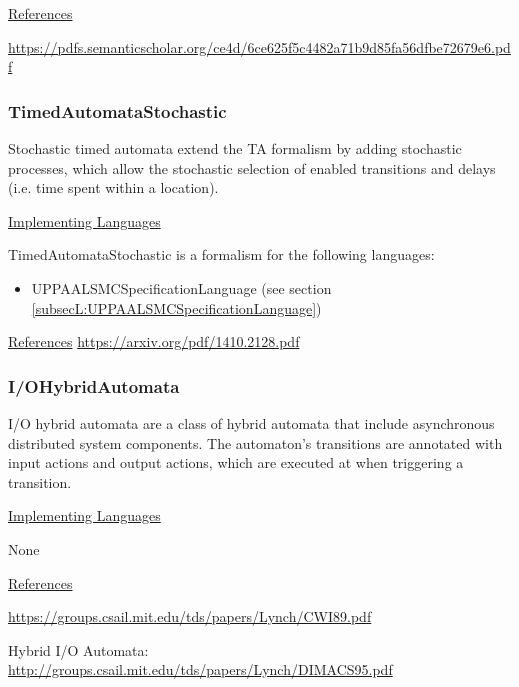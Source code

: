 \underline{References}

\url{https://pdfs.semanticscholar.org/ce4d/6ce625f5c4482a71b9d85fa56dfbe72679e6.pdf}


\subsubsection{TimedAutomataStochastic}
\label{subsubsecF:TimedAutomataStochastic}

Stochastic timed automata extend the TA formalism by adding stochastic processes, which allow the stochastic selection of enabled transitions and delays (i.e. time spent within a location).


\underline{Implementing Languages}

TimedAutomataStochastic is a formalism for the following languages:
\begin{itemize}
	\item UPPAALSMCSpecificationLanguage (see section \ref{subsecL:UPPAALSMCSpecificationLanguage})
\end{itemize}


\underline{References}
\url{https://arxiv.org/pdf/1410.2128.pdf}

\subsubsection{I/O\textunderscore HybridAutomata}
\label{subsubsecF:I/O_Automata}




I/O hybrid automata are a class of hybrid automata that include asynchronous distributed system components. The automaton's transitions are annotated with input actions and output actions, which are executed at when triggering a transition.

\underline{Implementing Languages}

None


\underline{References}

\url{https://groups.csail.mit.edu/tds/papers/Lynch/CWI89.pdf}

Hybrid I/O Automata: \url{http://groups.csail.mit.edu/tds/papers/Lynch/DIMACS95.pdf}

